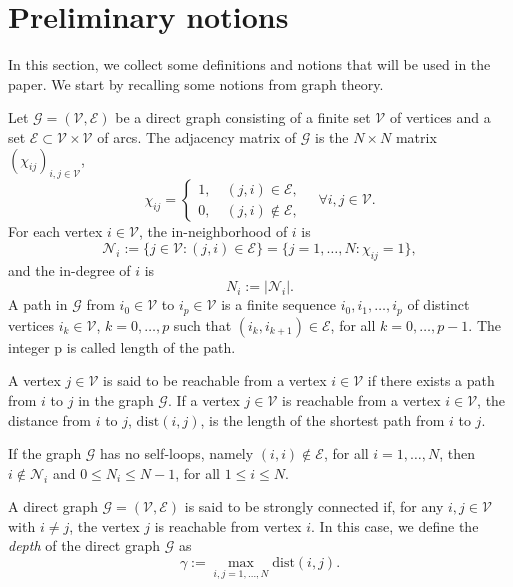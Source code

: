 \documentclass[11pt]{article}
\begin{document}
\section{Preliminary notions}\label{2}
\setcounter{equation}{0}
  In this section, we collect some definitions and notions that will be used in the paper. We start by recalling some notions from graph theory.
\begin{defn}
	Let $ \mathcal{G}=(\mathcal{V}, \mathcal{E})$ be a direct graph consisting of a finite set $\mathcal{V}$ of vertices and a set $\mathcal{E} \subset \mathcal{V} \times \mathcal{V}$ of arcs. The adjacency matrix of $\mathcal{G}$ is the $N\times N$ matrix $(\chi_{ij})_{i,j\in\mathcal{V}}$,
	$$\chi_{ij}=\begin{cases}
		1,\quad (j,i)\in \mathcal{E},\\
		0,\quad (j,i)\notin \mathcal{E},
	\end{cases}\quad \forall i,j\in \mathcal{V}.$$
	For each vertex $i\in \mathcal{V}$, the in-neighborhood of $i$ is \begin{equation}\label{N_i}
		\mathcal{N}_i:=\{j\in \mathcal{V}:(j,i)\in \mathcal{E}\}=\{j= 1,\dots,N:\chi_{ij}=1\},
	\end{equation} 
	and the in-degree of $i$ is \begin{equation}\label{cardN_i}
		N_i:=|\mathcal{N}_i|.
	\end{equation}
	A path in $\mathcal{G}$ from $i_0\in \mathcal{V}$ to $i_p\in\mathcal{V}$ is a finite sequence $i_0, i_1, \dots, i_p$ of distinct vertices $i_k\in \mathcal{V}$, $k=0,\dots,p$ such that $(i_k,i_{k+1})\in \mathcal{E}$, for all $k=0,\dots,p-1$. The integer p is called length of the path. 
	
	A vertex $j\in \mathcal{V}$ is said to be reachable from a vertex $i\in \mathcal{V}$ if there exists a path from $i$ to $j$ in the graph $\mathcal{G}$. If a vertex $j\in \mathcal{V}$ is reachable from a vertex $i\in \mathcal{V}$, the distance from $i$ to $j$, $\text{dist}(i,j)$, is the length of the shortest path from $i$ to $j$. 
\end{defn}
\begin{oss}
	If the graph $\mathcal{G}$ has no self-loops, namely $(i,i)\notin \mathcal{E}$, for all $i=1,\dots,N$, then $i \notin \mathcal{N}_i$ and $0\leq N_i\leq N-1$, for all $1 \leq i \leq N$. 
\end{oss}
\begin{defn}
	A direct graph $\mathcal{G}=(\mathcal{V},\mathcal{E})$ is said to be strongly connected if, for any $i,j\in\mathcal{V}$ with $i\neq j$, the vertex $j$ is reachable from vertex $i$. In this case, we define the \emph{depth} of the direct graph $\mathcal{G}$ as
	\begin{equation}\label{depth}
		\gamma:=\max_{i,j=1,\dots,N} \text{dist}(i,j).
	\end{equation}
\end{defn}
\end{document}
